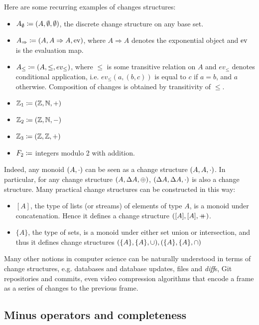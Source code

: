 Here are some recurring examples of changes structures:
\begin{itemize}
  \item $A_\emptyset \coloneqq (A,\emptyset,\emptyset)$, the discrete change structure on any base set.
  \item $A_\Rightarrow \coloneqq (A,A\Rightarrow A,\operatorname{ev})$, where $A
    \Rightarrow A$ denotes the exponential object and $\operatorname{ev}$ is the evaluation map.
  \item $A_\leq \coloneqq (A,\leq,ev_\leq)$, where $\leq$ is some
    transitive relation on $A$ and $ev_\leq$ denotes
    conditional application, i.e. $ev_\leq(a, (b, c))$ is equal to $c$ if $a = b$, and $a$ otherwise. Composition of changes is obtained
    by transitivity of $\leq$.
  \item $\mathbb{Z}_1 \coloneqq (\mathbb{Z},\mathbb{N},+)$
  \item $\mathbb{Z}_2 \coloneqq (\mathbb{Z},\mathbb{N},-)$
  \item $\mathbb{Z}_3 \coloneqq (\mathbb{Z},\mathbb{Z},+)$
  \item $F_2 \coloneqq$ integers modulo 2 with addition.
\end{itemize}

Indeed, any monoid $(A, \cdot)$ can be seen as a change structure $(A,A,\cdot)$. In particular,
for any change structure $(A,\Delta A,\oplus)$,
$(\Delta A,\Delta A,\cdot)$ is also a change structure. Many practical change structures
can be constructed in this way:
\begin{itemize}
  \item $[A]$, the type of lists (or streams) of elements of type $A$, is a monoid under
  concatenation. Hence it defines a change structure $([A],[A],\mathbin{+\mkern-10mu+})$.
  \item $\{A\}$, the type of sets, is a monoid under either set union or intersection,
  and thus it defines change structures $(\{A\},\{A\},\cup),(\{A\},\{A\},\cap)$
\end{itemize}

Many other notions in computer science can be naturally understood in terms of change structures, e.g. databases
and database updates, files and \textit{diff}s, Git repositories and commits, even video compression
algorithms that encode a frame as a series of changes to the previous frame.

\subsection{Minus operators and completeness}


